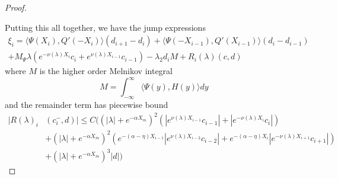 \documentclass[thesis.tex]{subfiles}
\begin{document}
\begin{lemma}
\begin{proof}
\begin{enumerate}
\end{enumerate}

Putting this all together, we have the jump expressions
\begin{align*}
\xi_i = \langle \Psi(X_i), Q'(-X_i) \rangle (d_{i+1} - d_i ) + \langle \Psi(-X_{i-1}), Q'(X_{i-1}) \rangle (d_i - d_{i-1} ) \\
+ M_\Psi \lambda( e^{-\nu(\lambda)X_i}c_i + e^{\nu(\lambda)X_{i-1}}c_{i-1})
- \lambda_2 d_i M + R_i(\lambda)(c, d)
\end{align*}
where $M$ is the higher order Melnikov integral
\[
M = \int_{-\infty}^\infty \langle \Psi(y), H(y) \rangle dy
\]
and the remainder term has piecewise bound
\begin{align*}
|R(\lambda)_i&(c_i^-, d)| \leq C \Big( (|\lambda| + e^{-\alpha X_m})^2(|e^{\nu(\lambda)X_{i-1}}c_{i-1}| + |e^{-\nu(\lambda)X_i}c_i|) \\
&+ (|\lambda| + e^{-\alpha X_m})^2(e^{-(\alpha - \eta) X_{i-1}} |e^{\nu(\lambda)X_{i-2}}c_{i-2}| + e^{-(\alpha - \eta) X_i} |e^{-\nu(\lambda)X_{i+1}}c_{i+1}|) \\
&+ (|\lambda| + e^{-\alpha X_m})^3 |d| \Big)
\end{align*}


\end{proof}
\end{lemma}
\end{document}
